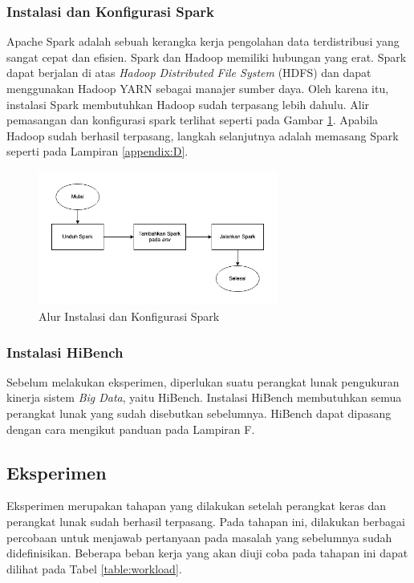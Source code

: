 \subsubsection{Instalasi dan Konfigurasi Spark}
Apache Spark adalah sebuah kerangka kerja pengolahan data terdistribusi yang sangat cepat dan efisien. Spark dan Hadoop memiliki hubungan yang erat. Spark dapat berjalan di atas \textit{Hadoop Distributed File System} (HDFS) dan dapat menggunakan Hadoop YARN sebagai manajer sumber daya. Oleh karena itu, instalasi Spark membutuhkan Hadoop sudah terpasang lebih dahulu. Alir pemasangan dan konfigurasi spark terlihat seperti pada Gambar \ref{fig:spark-flow}. Apabila Hadoop sudah berhasil terpasang, langkah selanjutnya adalah memasang Spark seperti pada Lampiran \ref{appendix:D}.

\begin{figure}[h]
    \centering
    \includegraphics[width=0.7\textwidth]{figures/ch03/spark-flow.png}
    \caption{Alur Instalasi dan Konfigurasi Spark}
    \label{fig:spark-flow}
\end{figure}

\subsubsection{Instalasi HiBench}
Sebelum melakukan eksperimen, diperlukan suatu perangkat lunak pengukuran kinerja sistem \textit{Big Data}, yaitu HiBench. Instalasi HiBench membutuhkan semua perangkat lunak yang sudah disebutkan sebelumnya. HiBench dapat dipasang dengan cara mengikut panduan pada Lampiran F.

\subsection{Eksperimen}
Eksperimen merupakan tahapan yang dilakukan setelah perangkat keras dan perangkat lunak sudah berhasil terpasang. Pada tahapan ini, dilakukan berbagai percobaan untuk menjawab pertanyaan pada masalah yang sebelumnya sudah didefinisikan. Beberapa beban kerja yang akan diuji coba pada tahapan ini dapat dilihat pada Tabel \ref{table:workload}. 

